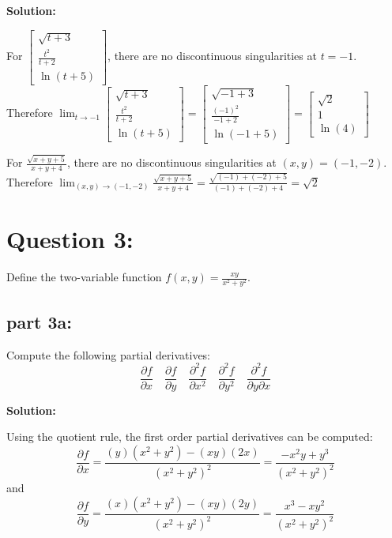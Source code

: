 \documentclass{article}
\newcommand{\colvec}[3]{\begin{bmatrix} #1 \\ #2 \\ #3 \end{bmatrix}}
\newcommand{\partdiff}[2]{\frac{\partial #1}{\partial #2}}
\newcommand{\dr}[1]{\textcolor{dark_red}{#1}}
\begin{document}
\vspace{0.5cm}

\dr{\bf Solution:}

\vspace{0.5cm}

\dr{For \(\colvec{\sqrt{t + 3}}{\frac{t^2}{t+2}}{\ln(t + 5)}\), there are no discontinuous singularities at \(t = -1\). Therefore \(\lim_{t \to -1} \colvec{\sqrt{t + 3}}{\frac{t^2}{t+2}}{\ln(t + 5)} = \colvec{\sqrt{-1 + 3}}{\frac{(-1)^2}{-1+2}}{\ln(-1 + 5)} = \colvec{\sqrt{2}}{1}{\ln(4)}\)}

\vspace{0.5cm}

\dr{For \(\frac{\sqrt{x+y+5}}{x+y+4}\), there are no discontinuous singularities at \((x,y) = (-1,-2)\). Therefore \(\lim_{(x,y) \to (-1,-2)} \frac{\sqrt{x+y+5}}{x+y+4} = \frac{\sqrt{(-1)+(-2)+5}}{(-1)+(-2)+4} = \sqrt{2}\)}


\section*{Question 3:}

Define the two-variable function \(f(x,y) = \frac{xy}{x^2 + y^2}\).

\subsection*{part 3a:}

Compute the following partial derivatives:
\[\frac{\partial f}{\partial x} \quad \frac{\partial f}{\partial y} \quad \frac{\partial^2 f}{\partial x^2} \quad \frac{\partial^2 f}{\partial y^2} \quad \frac{\partial^2 f}{\partial y \partial x}\] 

\vspace{0.5cm}

\dr{\bf Solution:}

\vspace{0.5cm}

\dr{Using the quotient rule, the first order partial derivatives can be computed:
\[\partdiff{f}{x} = \frac{(y)(x^2 + y^2) - (xy)(2x)}{(x^2 + y^2)^2} = \frac{-x^2y + y^3}{(x^2 + y^2)^2}\] 
and
\[\partdiff{f}{y} = \frac{(x)(x^2 + y^2) - (xy)(2y)}{(x^2 + y^2)^2} = \frac{x^3 - xy^2}{(x^2 + y^2)^2}\]
}
\end{document}

